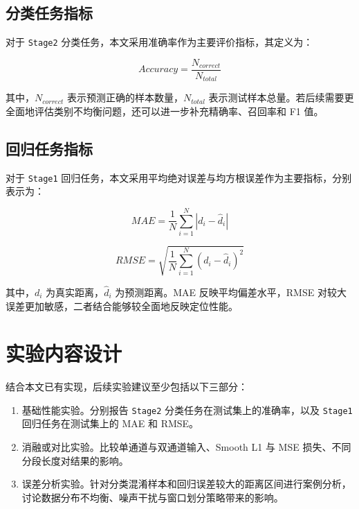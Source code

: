 \subsection{分类任务指标}

对于 \texttt{Stage2} 分类任务，本文采用准确率作为主要评价指标，其定义为：

\begin{equation}
Accuracy = \frac{N_{correct}}{N_{total}}
\end{equation}

其中，$N_{correct}$ 表示预测正确的样本数量，$N_{total}$ 表示测试样本总量。若后续需要更全面地评估类别不均衡问题，还可以进一步补充精确率、召回率和 F1 值。

\subsection{回归任务指标}

对于 \texttt{Stage1} 回归任务，本文采用平均绝对误差与均方根误差作为主要指标，分别表示为：

\begin{equation}
MAE = \frac{1}{N}\sum_{i=1}^{N}|d_i-\hat{d}_i|
\end{equation}

\begin{equation}
RMSE = \sqrt{\frac{1}{N}\sum_{i=1}^{N}(d_i-\hat{d}_i)^2}
\end{equation}

其中，$d_i$ 为真实距离，$\hat{d}_i$ 为预测距离。MAE 反映平均偏差水平，RMSE 对较大误差更加敏感，二者结合能够较全面地反映定位性能。

\section{实验内容设计}

结合本文已有实现，后续实验建议至少包括以下三部分：

\begin{enumerate}
  \item 基础性能实验。分别报告 \texttt{Stage2} 分类任务在测试集上的准确率，以及 \texttt{Stage1} 回归任务在测试集上的 MAE 和 RMSE。
  \item 消融或对比实验。比较单通道与双通道输入、Smooth L1 与 MSE 损失、不同分段长度对结果的影响。
  \item 误差分析实验。针对分类混淆样本和回归误差较大的距离区间进行案例分析，讨论数据分布不均衡、噪声干扰与窗口划分策略带来的影响。
\end{enumerate}

